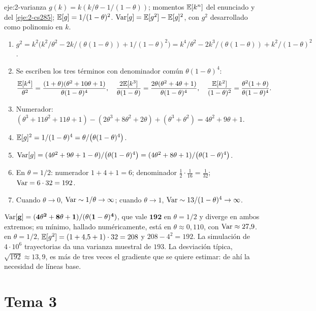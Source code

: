 \begin{solucion}{eje:2-varianza}
\datos $g(k)=k(k/\theta-1/(1-\theta))$; momentos $\mathbb{E}[k^{n}]$ del enunciado y del \cref{eje:2-cs285}; $\mathbb{E}[g]=1/(1-\theta)^{2}$.
\planteamiento $\operatorname{Var}[g]=\mathbb{E}[g^{2}]-\mathbb{E}[g]^{2}$, con $g^{2}$ desarrollado como polinomio en $k$.
\pasos
\begin{enumerate}[label=\arabic*.]
  \item $g^{2}=k^{2}\bigl(k^{2}/\theta^{2}-2k/(\theta(1-\theta))+1/(1-\theta)^{2}\bigr)=k^{4}/\theta^{2}-2k^{3}/(\theta(1-\theta))+k^{2}/(1-\theta)^{2}$.
  \item Se escriben los tres términos con denominador común $\theta(1-\theta)^{4}$:
  \[
  \frac{\mathbb{E}[k^{4}]}{\theta^{2}}=\frac{(1+\theta)(\theta^{2}+10\theta+1)}{\theta(1-\theta)^{4}},\quad \frac{2\mathbb{E}[k^{3}]}{\theta(1-\theta)}=\frac{2\theta(\theta^{2}+4\theta+1)}{\theta(1-\theta)^{4}},\quad \frac{\mathbb{E}[k^{2}]}{(1-\theta)^{2}}=\frac{\theta^{2}(1+\theta)}{\theta(1-\theta)^{4}}.
  \]
  \item Numerador: $(\theta^{3}+11\theta^{2}+11\theta+1)-(2\theta^{3}+8\theta^{2}+2\theta)+(\theta^{3}+\theta^{2})=4\theta^{2}+9\theta+1$.
  \item $\mathbb{E}[g]^{2}=1/(1-\theta)^{4}=\theta/\bigl(\theta(1-\theta)^{4}\bigr)$.
  \item $\operatorname{Var}[g]=(4\theta^{2}+9\theta+1-\theta)/\bigl(\theta(1-\theta)^{4}\bigr)=(4\theta^{2}+8\theta+1)/\bigl(\theta(1-\theta)^{4}\bigr)$.
  \item En $\theta=1/2$: numerador $1+4+1=6$; denominador $\tfrac12\cdot\tfrac1{16}=\tfrac1{32}$; $\operatorname{Var}=6\cdot 32=192$.
  \item Cuando $\theta\to 0$, $\operatorname{Var}\sim 1/\theta\to\infty$; cuando $\theta\to 1$, $\operatorname{Var}\sim 13/(1-\theta)^{4}\to\infty$.
\end{enumerate}
\resultado $\mathbf{\operatorname{Var}[g]=(4\theta^{2}+8\theta+1)/(\theta(1-\theta)^{4})}$, que vale $\mathbf{192}$ en $\theta=1/2$ y diverge en ambos extremos; su mínimo, hallado numéricamente, está en $\theta\approx 0{,}110$, con $\operatorname{Var}\approx 27{,}9$.
\comprobacion en $\theta=1/2$, $\mathbb{E}[g^{2}]=(1+4{,}5+1)\cdot 32=208$ y $208-4^{2}=192$. La simulación de $4\cdot 10^{6}$ trayectorias da una varianza muestral de $193$. La desviación típica, $\sqrt{192}\approx 13{,}9$, es más de tres veces el gradiente que se quiere estimar: de ahí la necesidad de líneas base.
\end{solucion}

\section{Tema 3}

